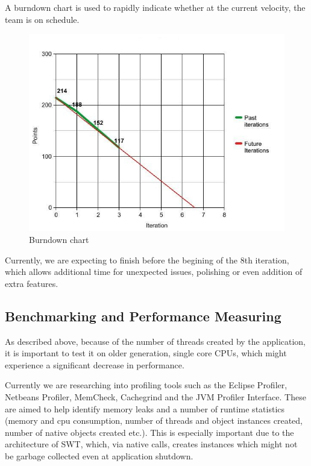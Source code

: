 \documentclass[10pt]{report}
\begin{document}
A burndown chart is used to rapidly indicate whether at the current velocity, the team is on schedule.

\begin{figure}[ht]
	\centering
	\includegraphics[bb= 0 0 400 400, scale=0.65]{graph.jpg}
	\caption{Burndown chart}
\end{figure}

Currently, we are expecting to finish before the begining of the 8th iteration, which allows additional time for unexpected issues, polishing or even addition of extra features.

\subsection{Benchmarking and Performance Measuring}
\label{perf}

As described above, because of the number of threads created by the application, it is important to test it on older generation, single core CPUs, which might experience a significant decrease in performance.

Currently we are researching into profiling tools such as the Eclipse Profiler, Netbeans Profiler, MemCheck, Cachegrind and the JVM Profiler Interface. These are aimed to help identify memory leaks and a number of runtime statistics (memory and cpu consumption, number of threads and object instances created, number of native objects created etc.). This is especially important due to the architecture of SWT, which, via native calls, creates instances which might not be garbage collected even at application shutdown.
\end{document}
